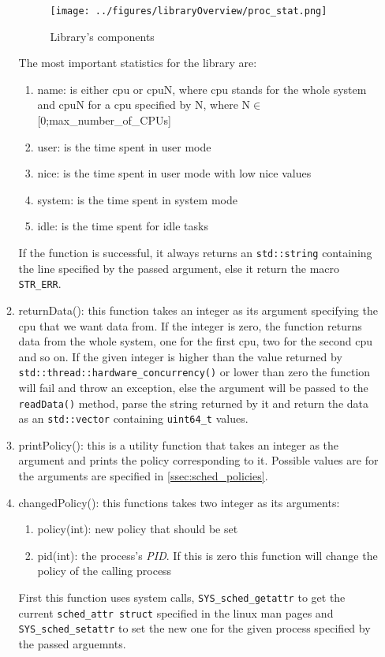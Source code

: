 \begin{enumerate}
\begin{enumerate}
		\begin{figure}[!htb]
			\centering
			\texttt{[image: ../figures/libraryOverview/proc\_stat.png]}
			\caption{Library's components}
		\end{figure}
		The most important statistics for the library are\cite{linux-man-proc}:
		\begin{enumerate}
			\item name: is either cpu or cpuN, where cpu stands for the whole system and cpuN for a cpu specified by N, where N$\in$ [0;max\_number\_of\_CPUs]
			\item user: is the time spent in user mode
			\item nice: is the time spent in user mode with low nice values
			\item system: is the time spent in system mode
			\item idle: is the time spent for idle tasks
		\end{enumerate}
			If the function is successful, it always returns an \texttt{std::string} containing the line specified by the passed argument, else it return the macro \texttt{STR\_ERR}.
		\item returnData(): this function takes an integer as its argument specifying the cpu that we want data from. If the integer is zero, the function returns data from the whole system, one for the first cpu, two for the second cpu and so on. If the given integer is higher than the value returned by \texttt{std::thread::hardware\_concurrency()} or lower than zero the function will fail and throw an exception, else the argument will be passed to the \texttt{readData()} method, parse the string returned by it and return the data as an \texttt{std::vector} containing \texttt{uint64\_t} values.
		\item printPolicy(): this is a utility function that takes an integer as the argument and prints the policy corresponding to it. Possible values are for the arguments are specified in \ref{ssec:sched_policies}.
		\item changedPolicy(): this functions takes two integer as its arguments:
		\begin{enumerate}
			\item policy(int): new policy that should be set
			\item pid(int): the process's \textit{PID}. If this is zero this function will change the policy of the calling process
		\end{enumerate}
		First this function uses system calls, \texttt{SYS\_sched\_getattr} to get the current \texttt{sched\_attr struct} specified in the linux man pages and \texttt{SYS\_sched\_setattr} to set the new one for the given process specified by the passed arguemnts.\cite{linux-man-set/getattribute}

\end{enumerate}
\end{enumerate}
